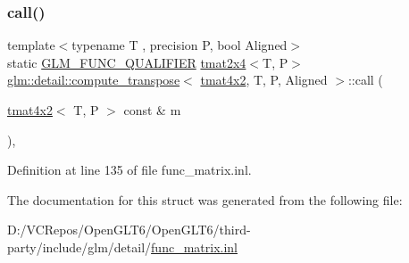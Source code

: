 \subsubsection{\texorpdfstring{call()}{call()}}
{\footnotesize\ttfamily template$<$typename T , precision P, bool Aligned$>$ \\
static \mbox{\hyperlink{setup_8hpp_a33fdea6f91c5f834105f7415e2a64407}{G\+L\+M\+\_\+\+F\+U\+N\+C\+\_\+\+Q\+U\+A\+L\+I\+F\+I\+ER}} \mbox{\hyperlink{structglm_1_1tmat2x4}{tmat2x4}}$<$T, P$>$ \mbox{\hyperlink{structglm_1_1detail_1_1compute__transpose}{glm\+::detail\+::compute\+\_\+transpose}}$<$ \mbox{\hyperlink{structglm_1_1tmat4x2}{tmat4x2}}, T, P, Aligned $>$\+::call (\begin{DoxyParamCaption}\item[{\mbox{\hyperlink{structglm_1_1tmat4x2}{tmat4x2}}$<$ T, P $>$ const \&}]{m }\end{DoxyParamCaption})\hspace{0.3cm}{\ttfamily [inline]}, {\ttfamily [static]}}



Definition at line 135 of file func\+\_\+matrix.\+inl.



The documentation for this struct was generated from the following file\+:\begin{DoxyCompactItemize}
\item 
D\+:/\+V\+C\+Repos/\+Open\+G\+L\+T6/\+Open\+G\+L\+T6/third-\/party/include/glm/detail/\mbox{\hyperlink{func__matrix_8inl}{func\+\_\+matrix.\+inl}}\end{DoxyCompactItemize}
